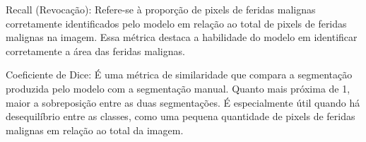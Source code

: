 Recall (Revocação): Refere-se à proporção de pixels de feridas malignas corretamente identificados pelo modelo em relação ao total de pixels de feridas malignas na imagem. Essa métrica destaca a habilidade do modelo em identificar corretamente a área das feridas malignas.

Coeficiente de Dice: É uma métrica de similaridade que compara a segmentação produzida pelo modelo com a segmentação manual. Quanto mais próxima de 1, maior a sobreposição entre as duas segmentações. É especialmente útil quando há desequilíbrio entre as classes, como uma pequena quantidade de pixels de feridas malignas em relação ao total da imagem.